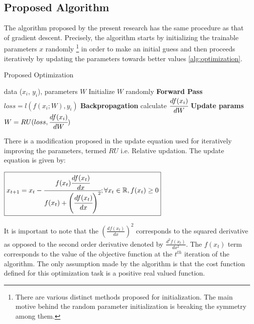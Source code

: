\documentclass{article}
\begin{document}
\subsection{Proposed Algorithm}
The algorithm proposed by the present research has the same procedure as that of gradient descent. Precisely, the algorithm starts by initializing the trainable parameters $x$ randomly \footnote{There are various distinct methods proposed for initialization. The main motive behind the random parameter initialization is breaking the symmetry among them.} in order to make an initial guess and then proceeds iteratively by updating the parameters towards better values \ref{alg:optimization}.

\begin{algorithm}[!htb]
   \caption{Proposed Optimization}
   \label{alg:optimization}
\begin{algorithmic}
    data ($x_i$, $y_i$), parameters $W$
   \STATE Initialize $W$ randomly
   \REPEAT
   \STATE \textbf{Forward Pass} $loss = l(f(x_i; W), y_i)$
   \STATE \textbf{Backpropagation} calculate $\cfrac{df(x_i)}{dW}$
   \STATE \textbf{Update params} $W = RU(loss, \cfrac{df(x_i)}{dW})$
\end{algorithmic}
\end{algorithm}

There is a modification proposed in the update equation used for iteratively improving the parameters, termed $RU$ i.e. Relative updation. The update equation is given by:

\begin{center}	
	$\boxed{x_{t + 1} = x_{t}  - \cfrac{f(x_t) \cfrac{df(x_t)}{dx}}{f(x_t) + \left(\cfrac{df(x_t)}{dx}\right)^2}; \forall x_t \in \mathbb{R}, f(x_t) \geq 0 }$
	
\end{center}

It is important to note that the $\left(\frac{df(x_t)}{dx}\right)^2$ corresponds to the squared derivative as opposed to the second order derivative denoted by $\frac{d^2f(x_t)}{dx^2}$. The $f(x_t)$ term corresponds to the value of the objective function at the $t^{th}$ iteration of the algorithm. The only assumption made by the algorithm is that the cost function defined for this optimization task is a positive real valued function.
\end{document}

